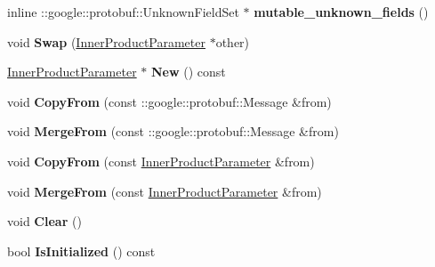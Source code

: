 \begin{DoxyCompactItemize}
inline \+::google\+::protobuf\+::\+Unknown\+Field\+Set $\ast$ {\bfseries mutable\+\_\+unknown\+\_\+fields} ()
\item 
\mbox{\label{classcaffe_1_1_inner_product_parameter_abadd64de7f2b318975e8473d24355945}} 
void {\bfseries Swap} (\mbox{\hyperlink{classcaffe_1_1_inner_product_parameter}{Inner\+Product\+Parameter}} $\ast$other)
\item 
\mbox{\label{classcaffe_1_1_inner_product_parameter_abb9e12953a9111b586021d9eee8a96e7}} 
\mbox{\hyperlink{classcaffe_1_1_inner_product_parameter}{Inner\+Product\+Parameter}} $\ast$ {\bfseries New} () const
\item 
\mbox{\label{classcaffe_1_1_inner_product_parameter_a5838e8caf825837bdfcde39ecab5f6f6}} 
void {\bfseries Copy\+From} (const \+::google\+::protobuf\+::\+Message \&from)
\item 
\mbox{\label{classcaffe_1_1_inner_product_parameter_a1fb4593eaf8e44ae4e1e7d3cf992c40f}} 
void {\bfseries Merge\+From} (const \+::google\+::protobuf\+::\+Message \&from)
\item 
\mbox{\label{classcaffe_1_1_inner_product_parameter_af896b4cfba6f961582b881657101ea8f}} 
void {\bfseries Copy\+From} (const \mbox{\hyperlink{classcaffe_1_1_inner_product_parameter}{Inner\+Product\+Parameter}} \&from)
\item 
\mbox{\label{classcaffe_1_1_inner_product_parameter_a44c5701570fbf9e558d58dfa448b1f19}} 
void {\bfseries Merge\+From} (const \mbox{\hyperlink{classcaffe_1_1_inner_product_parameter}{Inner\+Product\+Parameter}} \&from)
\item 
\mbox{\label{classcaffe_1_1_inner_product_parameter_ac2196357abec178f3404e8b6c33b8a43}} 
void {\bfseries Clear} ()
\item 
\mbox{\label{classcaffe_1_1_inner_product_parameter_a2acfff83fe9e48da459b38a70bf8a5fa}} 
bool {\bfseries Is\+Initialized} () const

\end{DoxyCompactItemize}
